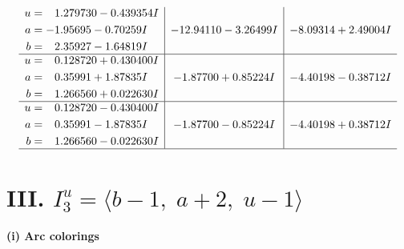 \documentclass[1p]{elsarticle_modified}
\theoremstyle{definition}
\begin{document}
$$\begin{array}{c|c|c}
\begin{aligned}
u &= \phantom{-}1.279730 - 0.439354 I \\
a &= -1.95695 - 0.70259 I \\
b &= \phantom{-}2.35927 - 1.64819 I\end{aligned}
 & -12.94110 - 3.26499 I & -8.09314 + 2.49004 I \\ \hline\begin{aligned}
u &= \phantom{-}0.128720 + 0.430400 I \\
a &= \phantom{-}0.35991 + 1.87835 I \\
b &= \phantom{-}1.266560 + 0.022630 I\end{aligned}
 & -1.87700 + 0.85224 I & -4.40198 - 0.38712 I \\ \hline\begin{aligned}
u &= \phantom{-}0.128720 - 0.430400 I \\
a &= \phantom{-}0.35991 - 1.87835 I \\
b &= \phantom{-}1.266560 - 0.022630 I\end{aligned}
 & -1.87700 - 0.85224 I & -4.40198 + 0.38712 I\\
 \hline 
 \end{array}$$\newpage\newpage\renewcommand{\arraystretch}{1}
\centering \section*{III. $I^u_{3}= \langle b-1,\;a+2,\;u-1 \rangle$}
\flushleft \textbf{(i) Arc colorings}\\
\end{document}
